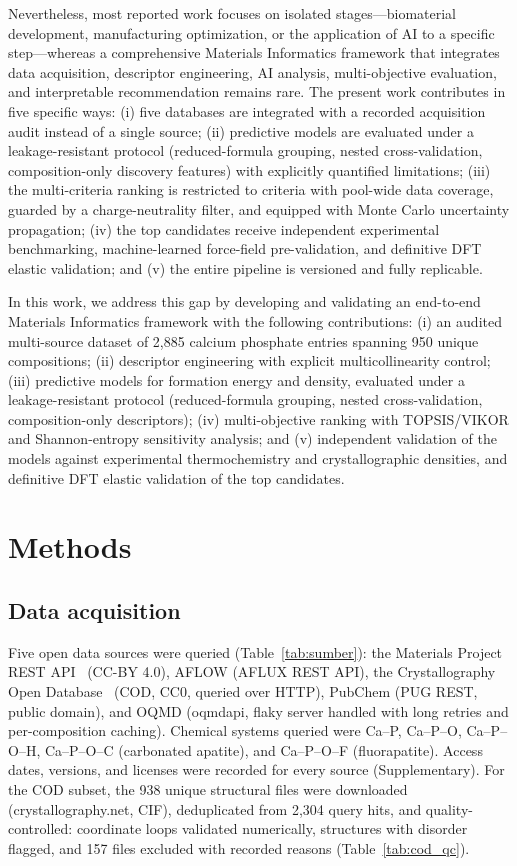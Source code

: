 \documentclass[11pt,a4paper]{article}
\begin{document}
Nevertheless, most reported work focuses on isolated stages---biomaterial development, manufacturing optimization, or the application of AI to a specific step---whereas a comprehensive Materials Informatics framework that integrates data acquisition, descriptor engineering, AI analysis, multi-objective evaluation, and interpretable recommendation remains rare. The present work contributes in five specific ways: (i) five databases are integrated with a recorded acquisition audit instead of a single source; (ii) predictive models are evaluated under a leakage-resistant protocol (reduced-formula grouping, nested cross-validation, composition-only discovery features) with explicitly quantified limitations; (iii) the multi-criteria ranking is restricted to criteria with pool-wide data coverage, guarded by a charge-neutrality filter, and equipped with Monte Carlo uncertainty propagation; (iv) the top candidates receive independent experimental benchmarking, machine-learned force-field pre-validation, and definitive DFT elastic validation; and (v) the entire pipeline is versioned and fully replicable.

In this work, we address this gap by developing and validating an end-to-end Materials Informatics framework with the following contributions: (i) an audited multi-source dataset of 2{,}885 calcium phosphate entries spanning 950 unique compositions; (ii) descriptor engineering with explicit multicollinearity control; (iii) predictive models for formation energy and density, evaluated under a leakage-resistant protocol (reduced-formula grouping, nested cross-validation, composition-only descriptors); (iv) multi-objective ranking with TOPSIS/VIKOR and Shannon-entropy sensitivity analysis; and (v) independent validation of the models against experimental thermochemistry and crystallographic densities, and definitive DFT elastic validation of the top candidates.

\section{Methods}

\subsection{Data acquisition}
Five open data sources were queried (Table~\ref{tab:sumber}): the Materials Project REST API~\cite{jain2013} (CC-BY 4.0), AFLOW (AFLUX REST API), the Crystallography Open Database~\cite{grazulis2009} (COD, CC0, queried over HTTP), PubChem (PUG REST, public domain), and OQMD (oqmdapi, flaky server handled with long retries and per-composition caching). Chemical systems queried were Ca--P, Ca--P--O, Ca--P--O--H, Ca--P--O--C (carbonated apatite), and Ca--P--O--F (fluorapatite). Access dates, versions, and licenses were recorded for every source (Supplementary). For the COD subset, the 938 unique structural files were downloaded (crystallography.net, CIF), deduplicated from 2{,}304 query hits, and quality-controlled: coordinate loops validated numerically, structures with disorder flagged, and 157 files excluded with recorded reasons (Table~\ref{tab:cod_qc}).
\end{document}
